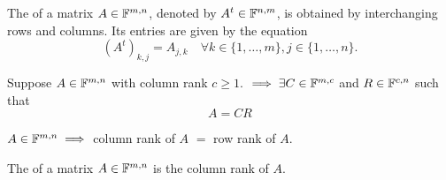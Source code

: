 \setcounter{thm}{53}
\begin{mydef}[transpose, $A^t$]
  \label{def: transpose}
  The  of a matrix $A\in \mathbb{F}^{m,n}$, denoted by $A^t\in \mathbb{F}^{n,m}$, is obtained by interchanging rows and columns. Its entries are given by the equation
  \begin{equation}
    \left( A^{t} \right)_{k,j} = A_{j,k} \quad \forall k \in \{1, \ldots, m\}, j \in \{1, \ldots, n\}.
  \end{equation}
\end{mydef}

\setcounter{thm}{55}
\begin{thm}
  Suppose $A \in \mathbb{F}^{m,n}$ with column rank $c \geq 1.$ $\implies \exists C\in \mathbb{F}^{m,c}$ and $R\in \mathbb{F}^{c,n}$ such that
  \begin{equation}
    A = CR
  \end{equation}
\end{thm}

\begin{thm}
  $A\in \mathbb{F}^{m,n} \implies$ column rank of $A$ $=$ row rank of $A$.
\end{thm}

\begin{mydef} [rank]
  The  of a matrix $A \in  \mathbb{F}^{m,n}$ is the column rank of $A$.
\end{mydef}